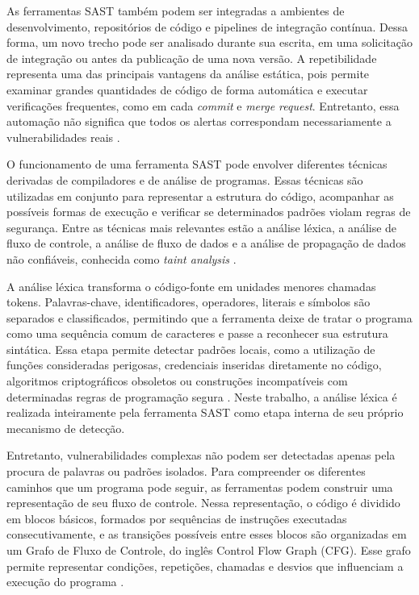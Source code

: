As ferramentas SAST também podem ser integradas a ambientes de desenvolvimento, repositórios de código e pipelines de integração contínua. Dessa forma, um novo trecho pode ser analisado durante sua escrita, em uma solicitação de integração ou antes da publicação de uma nova versão. A repetibilidade representa uma das principais vantagens da análise estática, pois permite examinar grandes quantidades de código de forma automática e executar verificações frequentes, como em cada \textit{commit} e \textit{merge request}. Entretanto, essa automação não significa que todos os alertas correspondam necessariamente a vulnerabilidades reais \cite{iranmanesh_zerofalse_2025}.

O funcionamento de uma ferramenta SAST pode envolver diferentes técnicas derivadas de compiladores e de análise de programas. Essas técnicas são utilizadas em conjunto para representar a estrutura do código, acompanhar as possíveis formas de execução e verificar se determinados padrões violam regras de segurança. Entre as técnicas mais relevantes estão a análise léxica, a análise de fluxo de controle, a análise de fluxo de dados e a análise de propagação de dados não confiáveis, conhecida como \textit{taint analysis} \cite{noauthor_static_nodate}.

A análise léxica transforma o código-fonte em unidades menores chamadas tokens. Palavras-chave, identificadores, operadores, literais e símbolos são separados e classificados, permitindo que a ferramenta deixe de tratar o programa como uma sequência comum de caracteres e passe a reconhecer sua estrutura sintática. Essa etapa permite detectar padrões locais, como a utilização de funções consideradas perigosas, credenciais inseridas diretamente no código, algoritmos criptográficos obsoletos ou construções incompatíveis com determinadas regras de programação segura \cite{noauthor_static_nodate}. Neste trabalho, a análise léxica é realizada inteiramente pela ferramenta SAST como etapa interna de seu próprio mecanismo de detecção.

Entretanto, vulnerabilidades complexas não podem ser detectadas apenas pela procura de palavras ou padrões isolados. Para compreender os diferentes caminhos que um programa pode seguir, as ferramentas podem construir uma representação de seu fluxo de controle. Nessa representação, o código é dividido em blocos básicos, formados por sequências de instruções executadas consecutivamente, e as transições possíveis entre esses blocos são organizadas em um Grafo de Fluxo de Controle, do inglês Control Flow Graph (CFG). Esse grafo permite representar condições, repetições, chamadas e desvios que influenciam a execução do programa \cite{noauthor_static_nodate}.

